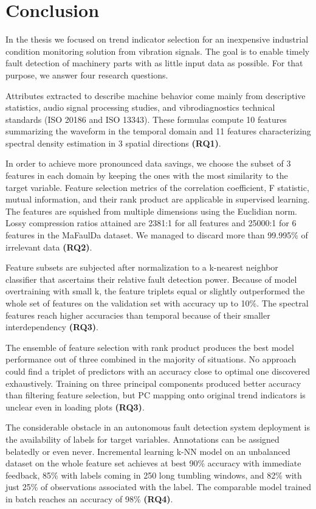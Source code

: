 \chapter{Conclusion} \label{section:conclusion}  
In the thesis we focused on trend indicator selection for an inexpensive industrial condition monitoring solution from vibration signals. The goal is to enable timely fault detection of machinery parts with as little input data as possible. For that purpose, we answer four research questions.

Attributes extracted to describe machine behavior come mainly from descriptive statistics, audio signal processing studies, and vibrodiagnostics technical standards (ISO 20186 and ISO 13343). These formulas compute 10 features summarizing the waveform in the temporal domain and 11 features characterizing spectral density estimation in 3 spatial directions \textbf{(RQ1)}.

In order to achieve more pronounced data savings, we choose the subset of 3 features in each domain by keeping the ones with the most similarity to the target variable. Feature selection metrics of the correlation coefficient, F statistic, mutual information, and their rank product are applicable in supervised learning. The features are squished from multiple dimensions using the Euclidian norm. Lossy compression ratios attained are 2381:1 for all features and 25000:1 for 6 features in the MaFaulDa dataset. We managed to discard more than 99.995\% of irrelevant data \textbf{(RQ2)}.

Feature subsets are subjected after normalization to a k-nearest neighbor classifier that ascertains their relative fault detection power. Because of model overtraining with small k, the feature triplets equal or slightly outperformed the whole set of features on the validation set with accuracy up to 10\%. The spectral features reach higher accuracies than temporal because of their smaller interdependency \textbf{(RQ3)}. 

The ensemble of feature selection with rank product produces the best model performance out of three combined in the majority of situations. No approach could find a triplet of predictors with an accuracy close to optimal one discovered exhaustively. Training on three principal components produced better accuracy than filtering feature selection, but PC mapping onto original trend indicators is unclear even in loading plots \textbf{(RQ3)}.

The considerable obstacle in an autonomous fault detection system deployment is the availability of labels for target variables. Annotations can be assigned belatedly or even never. Incremental learning k-NN model on an unbalanced dataset on the whole feature set achieves at best 90\% accuracy with immediate feedback, 85\% with labels coming in 250 long tumbling windows, and 82\% with just 25\% of observations associated with the label. The comparable model trained in batch reaches an accuracy of 98\% \textbf{(RQ4)}.

